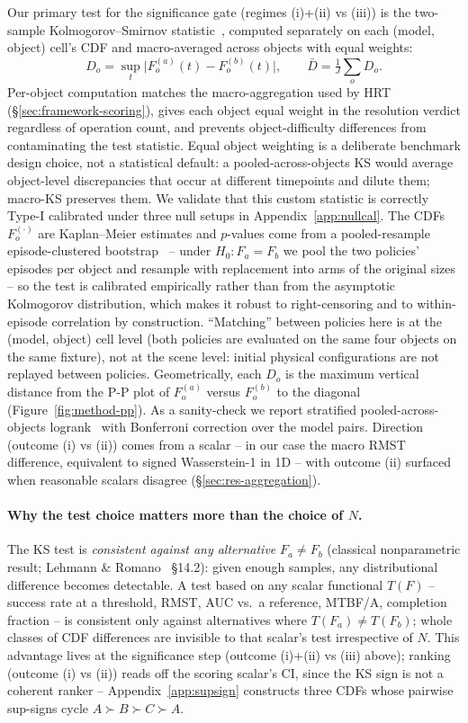 \documentclass{article}
\begin{document}
Our primary test for the significance gate (regimes (i)+(ii) vs (iii)) is the two-sample Kolmogorov--Smirnov statistic~\cite{smirnov1948}, computed separately on each (model, object) cell's CDF and macro-averaged across objects with equal weights:
\[
  D_o = \sup_t \big| F^{(a)}_o(t) - F^{(b)}_o(t) \big|,
  \qquad
  \bar D = \tfrac{1}{J}\textstyle\sum_o D_o.
\]
Per-object computation matches the macro-aggregation used by HRT (\S\ref{sec:framework-scoring}), gives each object equal weight in the resolution verdict regardless of operation count, and prevents object-difficulty differences from contaminating the test statistic. Equal object weighting is a deliberate benchmark design choice, not a statistical default: a pooled-across-objects KS would average object-level discrepancies that occur at different timepoints and dilute them; macro-KS preserves them. We validate that this custom statistic is correctly Type-I calibrated under three null setups in Appendix~\ref{app:nullcal}. The CDFs $F^{(\cdot)}_o$ are Kaplan--Meier estimates and $p$-values come from a pooled-resample episode-clustered bootstrap~\cite{efron1993} -- under $H_0: F_a = F_b$ we pool the two policies' episodes per object and resample with replacement into arms of the original sizes -- so the test is calibrated empirically rather than from the asymptotic Kolmogorov distribution, which makes it robust to right-censoring and to within-episode correlation by construction. ``Matching'' between policies here is at the (model, object) cell level (both policies are evaluated on the same four objects on the same fixture), not at the scene level: initial physical configurations are not replayed between policies. Geometrically, each $D_o$ is the maximum vertical distance from the P-P plot of $F^{(a)}_o$ versus $F^{(b)}_o$ to the diagonal (Figure~\ref{fig:method-pp}). As a sanity-check we report stratified pooled-across-objects logrank~\cite{mantel1966} with Bonferroni correction over the model pairs. Direction (outcome (i) vs (ii)) comes from a scalar -- in our case the macro RMST difference, equivalent to signed Wasserstein-1 in 1D -- with outcome (ii) surfaced when reasonable scalars disagree (\S\ref{sec:res-aggregation}).

\paragraph{Why the test choice matters more than the choice of $N$.} The KS test is \emph{consistent against any alternative} $F_a \neq F_b$ (classical nonparametric result; Lehmann \& Romano~\cite{lehmann_romano} \S14.2): given enough samples, any distributional difference becomes detectable. A test based on any scalar functional $T(F)$ -- success rate at a threshold, RMST, AUC vs.\ a reference, MTBF/A, completion fraction -- is consistent only against alternatives where $T(F_a) \neq T(F_b)$; whole classes of CDF differences are invisible to that scalar's test irrespective of $N$. This advantage lives at the significance step (outcome (i)+(ii) vs (iii) above); ranking (outcome (i) vs (ii)) reads off the scoring scalar's CI, since the KS sign is not a coherent ranker -- Appendix~\ref{app:supsign} constructs three CDFs whose pairwise sup-signs cycle $A {\succ} B {\succ} C {\succ} A$.
\end{document}
